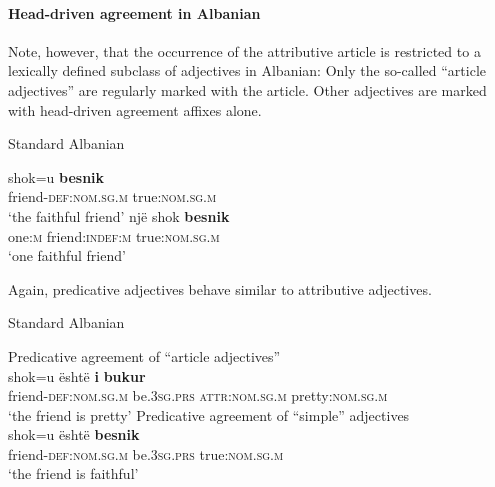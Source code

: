 \paragraph*{Head\hyp{}driven agreement in Albanian}
Note, however, that the occurrence of the attributive article is restricted to a lexically defined subclass of adjectives in Albanian: Only the so-called “article adjectives” are regularly marked with the article. Other adjectives are marked with head\hyp{}driven agreement affixes alone.
\begin{exe}
\ex \rm{Standard Albanian \citep[examples from][167]{himmelmann1997}}
\begin{xlist}
\ex
\gll	shok=u					\textbf{besnik}\\
	friend-\textsc{def:nom.sg.m} 	true:\textsc{nom.sg.m}\\
\glt	‘the faithful friend’
\ex
\gll 	një			shok					\textbf{besnik}\\
	one:\textsc{m}	friend:\textsc{indef:m} 	true:\textsc{nom.sg.m}\\
\glt	‘one faithful friend’
\end{xlist}
\end{exe}
Again, predicative adjectives behave similar to attributive adjectives.
\begin{exe}
\ex \rm{Standard Albanian \citep{demiraj1998}}\\
\begin{xlist}
\ex \rm{Predicative agreement of “article adjectives”}\\
\gll	shok=u është \textbf{i} \textbf{bukur}\\
	friend-\textsc{def:nom.sg.m} be\textsc{.3sg.prs} \textsc{attr:nom.sg.m} pretty:\textsc{nom.sg.m}\\
\glt	‘the friend is pretty’
\ex \rm{Predicative agreement of “simple” adjectives}\\
\gll	shok=u është \textbf{besnik}\\
	friend-\textsc{def:nom.sg.m} be\textsc{.3sg.prs} true:\textsc{nom.sg.m}\\
\glt	‘the friend is faithful’
\end{xlist}
\end{exe}

